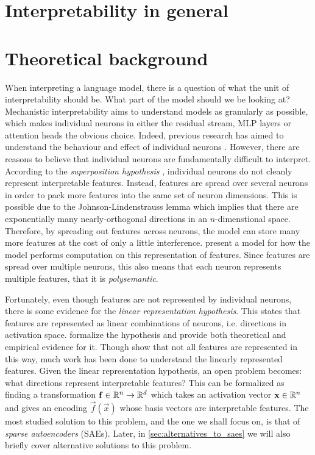 \section{Interpretability in general}



\section{Theoretical background}
When interpreting a language model, there is a question of what the unit of interpretability should be.
What part of the model should we be looking at?
Mechanistic interpretability aims to understand models as granularly as possible, which makes individual neurons in either the residual stream, MLP layers or attention heads the obvious choice.
Indeed, previous research has aimed to understand the behaviour and effect of individual neurons \cite{foote_neuron_2023}\cite{bills_language_2023}.
However, there are reasons to believe that individual neurons are fundamentally difficult to interpret.
According to the \emph{superposition hypothesis} \cite{elhage_toy_2022}, individual neurons do not cleanly represent interpretable features.
Instead, features are spread over several neurons in order to pack more features into the same set of neuron dimensions.
This is possible due to the Johnson-Lindenstrauss lemma which implies that there are exponentially many nearly-orthogonal directions in an $n$-dimenstional space.
Therefore, by spreading out features across neurons, the model can store many more features at the cost of only a little interference.
\cite{vaintrob_toward_2024} present a model for how the model performs computation on this representation of features.
Since features are spread over multiple neurons, this also means that each neuron represents multiple features, that it is \emph{polysemantic}.

Fortunately, even though features are not represented by individual neurons, there is some evidence for the \emph{linear representation hypothesis}.
This states that features are represented as linear combinations of neurons, i.e. directions in activation space.
\cite{park_linear_2023} formalize the hypothesis and provide both theoretical and empirical evidence for it.
Though \cite{engels_not_2024} show that not all features are represented in this way, much work has been done to understand the linearly represented features.
Given the linear representation hypothesis, an open problem becomes: what directions represent interpretable features?
This can be formalized as finding a transformation $\mathbf{f}\in\mathbb{R}^n\to\mathbb{R}^d$ which takes an activation vector $\mathbf{x}\in\mathbb{R}^n$ and gives an encoding $\vec f(\vec x)$ whose basis vectors are interpretable features.
The most studied solution to this problem, and the one we shall focus on, is that of \emph{sparse autoencoders} (SAEs).
Later, in \ref{sec:alternatives_to_saes} we will also briefly cover alternative solutions to this problem.

